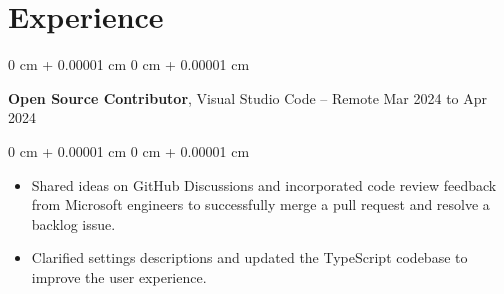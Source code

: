 \documentclass[10pt, letterpaper]{article}
\newenvironment{highlights}{
    \begin{itemize}[
        topsep=0.10 cm,
        parsep=0.10 cm,
        partopsep=0pt,
        itemsep=0pt,
        leftmargin=0 cm + 10pt
    ]
}{
    \end{itemize}
} %
\newenvironment{onecolentry}{
    \begin{adjustwidth}{
        0 cm + 0.00001 cm
    }{
        0 cm + 0.00001 cm
    }
}{
    \end{adjustwidth}
} %
\newenvironment{twocolentry}[2][]{
    \onecolentry
    \def\secondColumn{#2}
    \setcolumnwidth{\fill, 4.5 cm}
    \begin{paracol}{2}
}{
    \switchcolumn \raggedleft \secondColumn
    \end{paracol}
    \endonecolentry
} %
\begin{document}
    
    \section{Experience}



        
        \begin{twocolentry}{
            Mar 2024 to Apr 2024
        }
            \textbf{Open Source Contributor}, Visual Studio Code -- Remote\end{twocolentry}

        \vspace{0.10 cm}
        \begin{onecolentry}
            \begin{highlights}
                \item Shared ideas on GitHub Discussions and incorporated code review feedback from Microsoft engineers to successfully merge a pull request and resolve a backlog issue.
                \item Clarified settings descriptions and updated the TypeScript codebase to improve the user experience.
            \end{highlights}
        \end{onecolentry}



    
\end{document}
